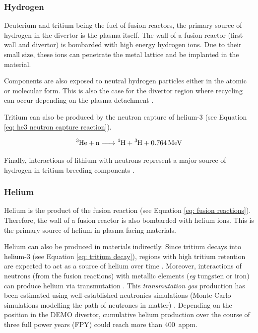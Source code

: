 \subsubsection{Hydrogen}
Deuterium and tritium being the fuel of fusion reactors, the primary source of hydrogen in the divertor is the plasma itself.
The wall of a fusion reactor (first wall and divertor) is bombarded with high energy hydrogen ions.
Due to their small size, these ions can penetrate the metal lattice and be implanted in the material.

Components are also exposed to neutral hydrogen particles either in the atomic or molecular form.
This is also the case for the divertor region where recycling can occur depending on the plasma detachment .

Tritium can also be produced by the neutron capture of helium-3  (see Equation \ref{eq: he3 neutron capture reaction}).

\begin{equation}
    \ce{^3He + n -> ^1H + ^3H + \SI{0.764}{MeV}}
    \label{eq: he3 neutron capture reaction}
\end{equation}

Finally, interactions of lithium with neutrons represent a major source of hydrogen in tritium breeding components .

\subsubsection{Helium}
Helium is the product of the fusion reaction (see Equation \ref{eq: fusion reactions}).
Therefore, the wall of a fusion reactor is also bombarded with helium ions.
This is the primary source of helium in plasma-facing materials.

Helium can also be produced in materials indirectly.
Since tritium decays into helium-3 (see Equation \ref{eq: tritium decay}), regions with high tritium retention are expected to act as a source of helium over time \cite{shimada_tritium_2017}.
Moreover, interactions of neutrons (from the fusion reactions) with metallic elements (\textit{eg} tungsten or iron) can produce helium via transmutation .
This \textit{transmutation gas} production has been estimated using well-established neutronics simulations (Monte-Carlo simulations modelling the path of neutroncs in matter) .
Depending on the position in the DEMO divertor, cumulative helium production over the course of three full power years (FPY) could reach more than \SI{400}{appm}.


